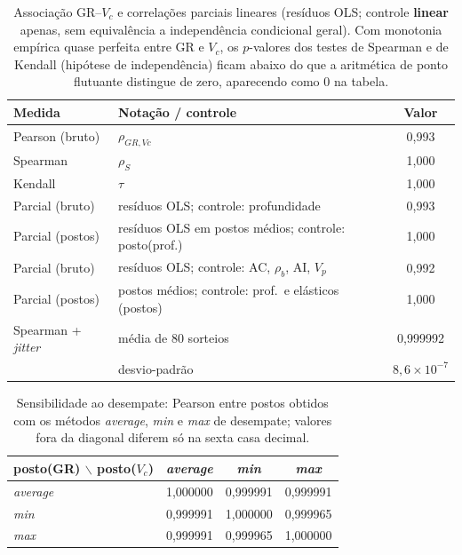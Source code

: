 \documentclass[12pt,a4paper]{article}
\begin{document}
\begin{table}[h]
\centering
\small
\begin{tabular}{p{2.6cm} p{4.9cm} c}
\toprule
Medida & Notação / controle & Valor \\
\midrule
Pearson (bruto) & \(\rho_{GR,Vc}\) & 0{,}993 \\
Spearman & \(\rho_S\) & 1{,}000 \\
Kendall & \(\tau\) & 1{,}000 \\
Parcial (bruto) & resíduos OLS; controle: profundidade & 0{,}993 \\
Parcial (postos) & resíduos OLS em postos médios; controle: posto(prof.) & 1{,}000 \\
Parcial (bruto) & resíduos OLS; controle: AC, \(\rho_b\), AI, \(V_p\) & 0{,}992 \\
Parcial (postos) & postos médios; controle: prof.\ e elásticos (postos) & 1{,}000 \\
Spearman + \textit{jitter} & média de 80 sorteios & 0{,}999992 \\
& desvio-padrão & \(8{,}6\times 10^{-7}\) \\
\bottomrule
\end{tabular}
\caption{Associação GR--\(V_c\) e correlações parciais lineares (resíduos
OLS; controle \textbf{linear} apenas, sem equivalência a independência condicional geral).
Com monotonia empírica quase perfeita entre GR e \(V_c\), os \(p\)-valores
dos testes de Spearman e de Kendall (hipótese de independência) ficam abaixo do
que a aritmética de ponto flutuante distingue de zero, aparecendo como \(0\) na
tabela.}
\label{tab:grvc_assoc}
\end{table}

\begin{table}[h]
\centering
\small
\begin{tabular}{lccc}
\toprule
posto(GR) $\backslash$ posto(\(V_c\)) & \textit{average} & \textit{min} & \textit{max} \\
\midrule
\textit{average} & 1{,}000000 & 0{,}999991 & 0{,}999991 \\
\textit{min} & 0{,}999991 & 1{,}000000 & 0{,}999965 \\
\textit{max} & 0{,}999991 & 0{,}999965 & 1{,}000000 \\
\bottomrule
\end{tabular}
\caption{Sensibilidade ao desempate: Pearson entre postos obtidos com os métodos
\textit{average}, \textit{min} e \textit{max} de desempate; valores fora da diagonal diferem
só na sexta casa decimal.}
\label{tab:grvc_rankmethods}
\end{table}
\end{document}
